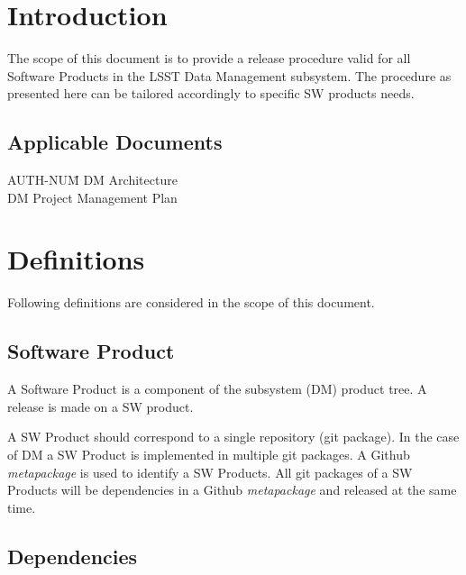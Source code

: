 \section{Introduction} \label{sec:intro}

The scope of this document is to provide a release procedure valid for all Software Products in the LSST Data Management subsystem. The procedure as presented here can be tailored accordingly to specific SW products needs.

\subsection{Applicable Documents}

\begin{tabbing}
AUTH-NUM\= \kill
{} \>     DM Architecture\\
 \>     DM Project Management Plan   \\
\end{tabbing}


\newpage
\section{Definitions} \label{sec:definitions}

Following definitions are considered in the scope of this document.


\subsection{Software Product} \label{sect:swprod}
A Software Product is a component of the subsystem (DM) product tree.
A release is made on a SW product.

A SW Product should correspond to a single repository (git package).
In the case of DM a SW Product is implemented in multiple git packages.
A Github \textit{metapackage} is used to identify a SW Products.
All git packages of a SW Products will be dependencies in a Github \textit{metapackage} and released at the same time.


\subsection{Dependencies} \label{sect:dependencies}

